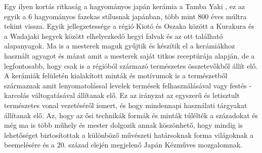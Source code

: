 \vspace{2 mm}
Egy ilyen kortás ritkaság a hagyományos japán kerámia a Tamba Yaki \cite{tambayaki}, ez az  egyik a 6 hagyományos fazekas stílusnak japánban, több mint 800 éves múltra tekint vissza. Egyik jellegzetessége a régió Kiotó és Oszaka között a Kurakura és a Wadajaki hegyek között elhelyezkedő hegyi falvak és az ott található alapanyagok. Ma is a mesterek maguk gyűjtik és készítik el a kerámiákhoz használt agyagot és mázat amit a mesterek saját titkos receptúrája alapján, de a legfontosabb, hogy csak is a régióból származó természetes összetevőkből állít elő. A kerámiák felületén kialakított minták és motívumok is a természetből származnak amit lenyomatolással levelek termések felhasználásával vagy festés - karcolás váltogatásával állítanak elő. Ez az irányzat az egyszerű és letisztult természetes vonal vezetéséről ismert, és hogy mindennapi használati tárgyakat állítanak elő. Az, hogy az ősi technikák formák és minták túlélték  a századokat és még ma is több műhely és mester dolgozik annak köszönhető, hogy mindig is lehetőséget biztosítottak a különböző művészeti határsoknak forma világoknak a beemelésére és a 20. század elején megjelenő Japán Kézműves mozgalomnak.




